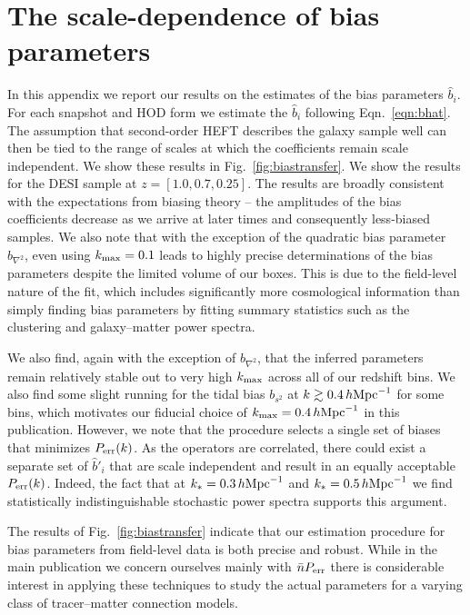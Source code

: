 \documentclass[fleqn,usenatbib]{mnras}
\newcommand{\ihmpc}{\,h{\rm Mpc}^{-1}}
\newcommand{\kmax}{k_{\rm max}}
\begin{document}
\section{The scale-dependence of bias parameters}
\label{appendix:A}
In this appendix we report our results on the estimates of the bias parameters $\hat{b}_i$. For each snapshot and HOD form we estimate the $\hat{b}_i$ following Eqn.~\ref{eqn:bhat}. The assumption that second-order HEFT describes the galaxy sample well can then be tied to the range of scales at which the coefficients remain scale independent. We show these results in Fig.~\ref{fig:biastransfer}. We show the results for the DESI sample at $z=[1.0, 0.7, 0.25]$. The results are broadly consistent with the expectations from biasing theory -- the amplitudes of the bias coefficients decrease as we arrive at later times and consequently less-biased samples. We also note that with the exception of the quadratic bias parameter $b_{\nabla^2}$, even using $\kmax = 0.1$ leads to highly precise determinations of the bias parameters despite the limited volume of our boxes. This is due to the field-level nature of the fit, which includes significantly more cosmological information than simply finding bias parameters by fitting summary statistics such as the clustering and galaxy--matter power spectra.\par 
We also find, again with the exception of $b_{\nabla^2}$, that the inferred parameters remain relatively stable out to very high $\kmax$ across all of our redshift bins. We also find some slight running for the tidal bias $b_{s^2}$ at $k \gtrsim 0.4 \ihmpc$ for some bins, which motivates our fiducial choice of $\kmax = 0.4 \ihmpc$ in this publication. However, we note that the procedure selects a single set of biases that minimizes $P_{\rm err}(k)$. As the operators are correlated, there could exist a separate set of $\hat{b}'_i$ that are scale independent and result in an equally acceptable $P_{\rm err}(k)$. Indeed, the fact that at $k_* = 0.3 \ihmpc$ and $k_* = 0.5 \ihmpc$ we find statistically indistinguishable stochastic power spectra supports this argument. \par 
The results of Fig.~\ref{fig:biastransfer} indicate that our estimation procedure for bias parameters from field-level data is both precise and robust. While in the main publication we concern ourselves mainly with $\bar{n} P_{\rm err}$ there is considerable interest in applying these techniques to study the actual parameters for a varying class of tracer--matter connection models. \par 
\end{document}
